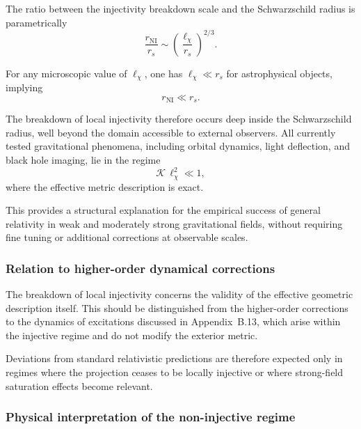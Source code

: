     The ratio between the injectivity breakdown scale and the Schwarzschild radius is
    parametrically
    \begin{equation}
      \frac{r_{\mathrm{NI}}}{r_s}
      \sim
      \left(\frac{\ell_\chi}{r_s}\right)^{2/3}.
      \label{eq:rNI-rs}
    \end{equation}

    For any microscopic value of $\ell_\chi$, one has $\ell_\chi \ll r_s$ for
    astrophysical objects, implying
    \begin{equation}
      r_{\mathrm{NI}} \ll r_s.
    \end{equation}

    The breakdown of local injectivity therefore occurs deep inside the Schwarzschild
    radius, well beyond the domain accessible to external observers.
    All currently tested gravitational phenomena, including orbital dynamics,
    light deflection, and black hole imaging, lie in the regime
    \begin{equation}
      \mathcal{K}\,\ell_\chi^2 \ll 1,
    \end{equation}
    where the effective metric description is exact.

    This provides a structural explanation for the empirical success of general
    relativity in weak and moderately strong gravitational fields, without requiring
    fine tuning or additional corrections at observable scales.

  \subsubsection*{Relation to higher-order dynamical corrections}

    The breakdown of local injectivity concerns the validity of the effective geometric
    description itself.
    This should be distinguished from the higher-order corrections to the dynamics of
    excitations discussed in Appendix~B.13, which arise within the injective regime and
    do not modify the exterior metric.

    Deviations from standard relativistic predictions are therefore expected only in
    regimes where the projection ceases to be locally injective or where strong-field
    saturation effects become relevant.

  \subsubsection*{Physical interpretation of the non-injective regime}

